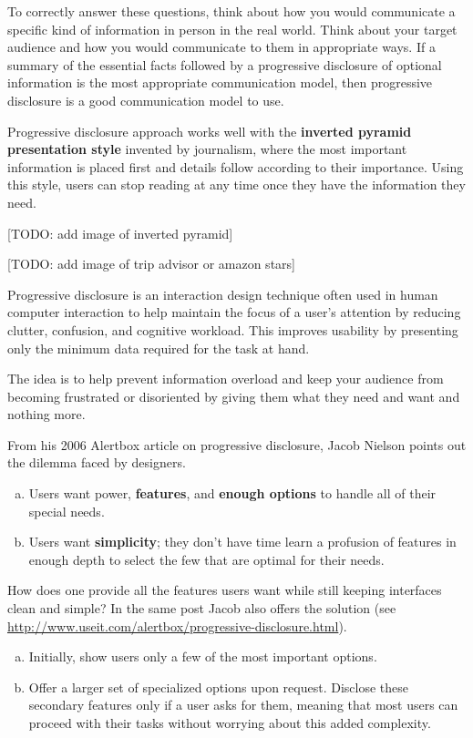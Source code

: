 To correctly answer these questions, think about how you would communicate a specific kind of information in person in the real world. Think about your target audience and how you would communicate to them in appropriate ways.
If a summary of the essential facts followed by a progressive disclosure of optional information is the most appropriate communication model, then progressive disclosure is a good communication model to use.

Progressive disclosure approach works well with the \textbf{inverted pyramid presentation style} invented by journalism, where the most important information is placed first and details follow according to their importance. Using this style, users can stop reading at any time once they have the information they need.

[TODO: add image of inverted pyramid]


[TODO: add image of trip advisor or amazon stars]


Progressive disclosure is an interaction design technique often used in human computer interaction to help maintain the focus of a user's attention by reducing clutter, confusion, and cognitive workload. This improves usability by presenting only the minimum data required for the task at hand.

The idea is to help prevent information overload and keep %
 your audience from becoming frustrated or disoriented by giving them what they need and want and nothing more.

From his 2006 Alertbox article on progressive disclosure, Jacob Nielson points out the dilemma faced by designers.

\begin{enumerate}[(a)]
	\item Users want power, \textbf{features}, and \textbf{enough options} to handle all of their special needs.
	\item Users want \textbf{simplicity}; they don’t have time learn a profusion of features in enough depth to select the few that are optimal for their needs.
\end{enumerate}

How does one provide all the features users want while still keeping interfaces clean and simple? In the same post Jacob also offers the solution (see \url{http://www.useit.com/alertbox/progressive-disclosure.html}).

\begin{enumerate}[(a)]
	\item Initially, show users only a few of the most important options.
	\item Offer a larger set of specialized options upon request. Disclose these secondary features only if a user asks for them, meaning that most users can proceed with their tasks without worrying about this added complexity.
\end{enumerate}

